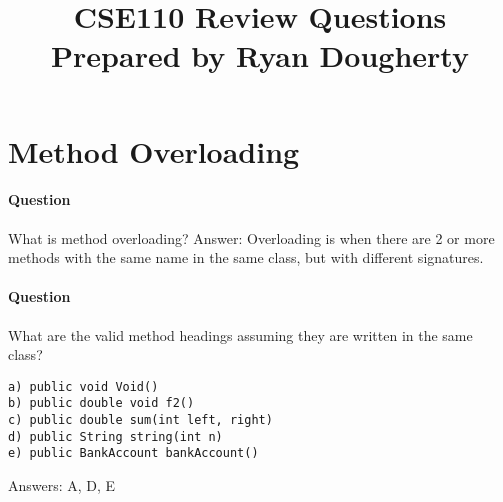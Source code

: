 \documentclass{article}
\date{}
\begin{document}
\title{\textbf{CSE110 Review Questions \\
Prepared by Ryan Dougherty}}
\maketitle

\section*{Method Overloading}


\setcounter{question_num}{1}
\paragraph{Question }
What is method overloading? {\color{red}Answer: Overloading is when there are 2 or more methods with the same name in the same class, but with different signatures. }

\addtocounter{question_num}{1}
\paragraph{Question }
What are the valid method headings assuming they are written in the same class?
\begin{lstlisting}
a) public void Void()
b) public double void f2()
c) public double sum(int left, right)
d) public String string(int n)
e) public BankAccount bankAccount()
\end{lstlisting}
{\color{red} Answers: A, D, E}
\end{document}
